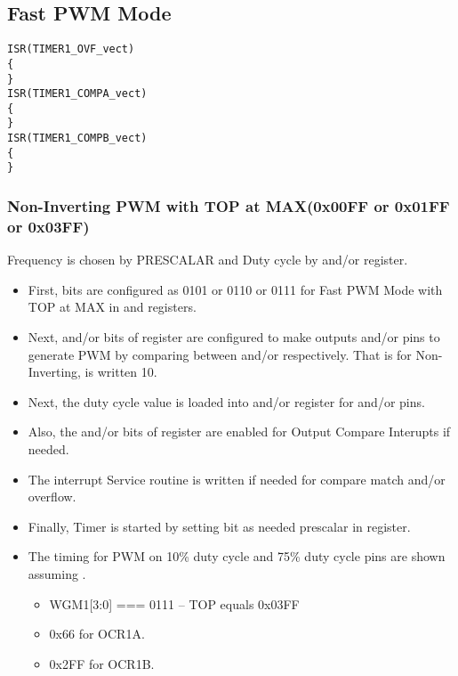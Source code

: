 \documentclass{article}
\begin{document}
\subsection{Fast PWM Mode}
\begin{verbatim}
ISR(TIMER1_OVF_vect)
{
} 
ISR(TIMER1_COMPA_vect)
{
}
ISR(TIMER1_COMPB_vect)
{
}
\end{verbatim}
\subsubsection{Non-Inverting PWM with TOP at MAX(0x00FF or 0x01FF or 0x03FF)}
\quad Frequency is chosen by PRESCALAR and Duty cycle by  and/or  register.
\begin{itemize}
    \item First,  bits are configured as 0101 or 0110 or 0111 for Fast PWM Mode with TOP at MAX in  and  registers.
    \item Next,  and/or  bits of  register are configured to make outputs  and/or  pins to generate PWM by comparing between  and/or  respectively. That is for Non-Inverting,  is written 10.
    \item Next, the duty cycle value is loaded into  and/or  register for  and/or  pins.
    \item Also, the  and/or  bits of  register  are enabled for Output Compare Interupts if needed.
    \item The interrupt Service routine is written if needed for compare match and/or overflow.
    \item Finally, Timer is started by setting  bit as needed prescalar in  register.
    \item The timing for PWM on 10\% duty cycle  and 75\% duty cycle pins are shown assuming .
    \begin{itemize}
        \item WGM1[3:0] === 0111 --	TOP equals 0x03FF
        \item 0x66 for OCR1A.
        \item 0x2FF for OCR1B.
    \end{itemize}
\end{itemize}
\end{document}
